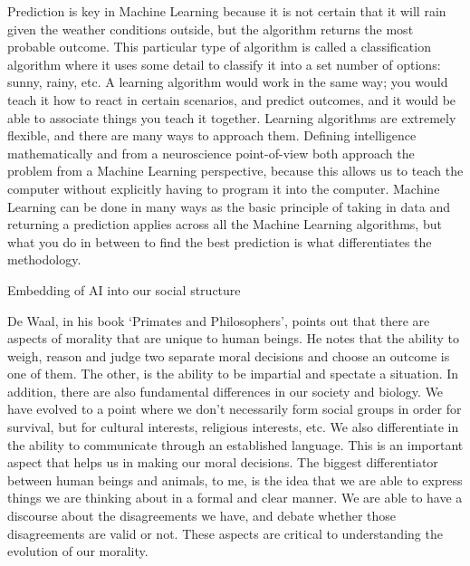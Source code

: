 \documentclass[11pt]{article}
\begin{document}
\par Prediction is key in Machine Learning because it is not certain that it will rain given the weather conditions outside, but the algorithm returns the most probable outcome. This particular type of algorithm is called a classification algorithm where it uses some detail to classify it into a set number of options: sunny, rainy, etc. A learning algorithm would work in the same way; you would teach it how to react in certain scenarios, and predict outcomes, and it would be able to associate things you teach it together. Learning algorithms are extremely flexible, and there are many ways to approach them. Defining intelligence mathematically and from a neuroscience point-of-view both approach the problem from a Machine Learning perspective, because this allows us to teach the computer without explicitly having to program it into the computer. Machine Learning can be done in many ways as the basic principle of taking in data and returning a prediction applies across all the Machine Learning algorithms, but what you do in between to find the best prediction is what differentiates the methodology.

\begin{center}
	{\large Embedding of AI into our social structure\par}
\end{center}

\par De Waal, in his book `Primates and Philosophers', points out that there are aspects of morality that are unique to human beings. He notes that the ability to weigh, reason and judge two separate moral decisions and choose an outcome is one of them. The other, is the ability to be impartial and spectate a situation. In addition, there are also fundamental differences in our society and biology. We have evolved to a point where we don't necessarily form social groups in order for survival, but for cultural interests, religious interests, etc. We also differentiate in the ability to communicate through an established language. This is an important aspect that helps us in making our moral decisions. The biggest differentiator between human beings and animals, to me, is the idea that we are able to express things we are thinking about in a formal and clear manner. We are able to have a discourse about the disagreements we have, and debate whether those disagreements are valid or not. These aspects are critical to understanding the evolution of our morality.
\end{document}
